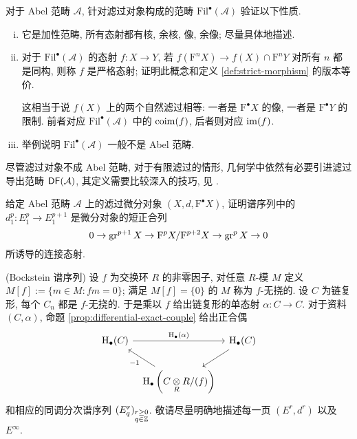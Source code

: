 \begin{Exercises}
	\item 对于 Abel 范畴 $\mathcal{A}$, 针对滤过对象构成的范畴 $\mathrm{Fil}^\bullet(\mathcal{A})$ 验证以下性质.
	\begin{enumerate}[(i)]
		\item 它是加性范畴, 所有态射都有核, 余核, 像, 余像; 尽量具体地描述.
		\item 对于 $\mathrm{Fil}^\bullet(\mathcal{A})$ 的态射 $f: X \to Y$, 若 $f(\mathrm{F}^n X) \to f(X) \cap \mathrm{F}^n Y$ 对所有 $n$ 都是同构, 则称 $f$ 是严格态射; 证明此概念和定义 \ref{def:strict-morphism} 的版本等价.
		
		\begin{hint}
			这相当于说 $f(X)$ 上的两个自然滤过相等: 一者是 $\mathrm{F}^\bullet X$ 的像, 一者是 $\mathrm{F}^\bullet Y$ 的限制. 前者对应 $\mathrm{Fil}^\bullet(\mathcal{A})$ 中的 $\operatorname{coim}(f)$, 后者则对应 $\operatorname{im}(f)$.
		\end{hint}
		\item 举例说明 $\mathrm{Fil}^\bullet(\mathcal{A})$ 一般不是 Abel 范畴.
	\end{enumerate}
	尽管滤过对象不成 Abel 范畴, 对于有限滤过的情形, 几何学中依然有必要引进滤过导出范畴 $\mathsf{DF}(\mathcal{A})$, 其定义需要比较深入的技巧, 见 \cite[Tag 05RX]{stacks}.
	
	\item 给定 Abel 范畴 $\mathcal{A}$ 上的滤过微分对象 $(X, d, \mathrm{F}^\bullet X)$, 证明谱序列中的 $d_1^p: E_1^p \to E_1^{p+1}$ 是微分对象的短正合列
	\[ 0 \to \operatorname{gr}^{p+1} X \to \mathrm{F}^p X / \mathrm{F}^{p+2} X \to \operatorname{gr}^p X \to 0 \]
	所诱导的连接态射.
	
	\item (Bockstein 谱序列) 设 $f$ 为交换环 $R$ 的非零因子, 对任意 $R$-模 $M$ 定义 $M[f] := \{m \in M: fm=0 \}$; 满足 $M[f] = \{0\}$ 的 $M$ 称为 $f$-无挠的. 设 $C$ 为链复形, 每个 $C_n$ 都是 $f$-无挠的. 于是乘以 $f$ 给出链复形的单态射 $\alpha: C \to C$. 对于资料 $(C, \alpha)$, 命题 \ref{prop:differential-exact-couple} 给出正合偶
	\[\begin{tikzcd}[column sep=tiny]
		\Hm_\bullet(C) \arrow[rr, "{\Hm_\bullet(\alpha)}"] & & \Hm_\bullet(C) \arrow[ld] \\
		& \Hm_\bullet\left(C \dotimes{R} R/(f)\right) \arrow[lu, "{-1}"] &
	\end{tikzcd}\]
	和相应的同调分次谱序列 $(E^r_q)_{\substack{r \geq 0 \\ q \in \mathbb{Z}}}$. 敬请尽量明确地描述每一页 $(E^r, d^r)$ 以及 $E^\infty$.
	

\end{Exercises}
